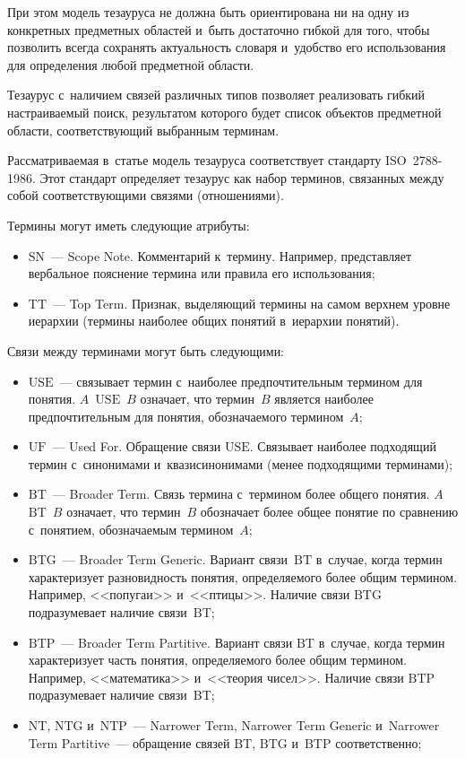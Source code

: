 \begin{multicols}{2}
     При этом модель тезауруса не должна быть ориентирована ни на одну 
из конкретных предметных областей и~быть достаточно гибкой для того, 
чтобы позволить всегда сохранять актуальность словаря и~удобство его 
использования для определения любой предметной об\-ласти.
     
     Тезаурус с~наличием связей различных типов позволяет реализовать 
гибкий настраиваемый поиск, результатом которого будет список объектов 
предметной об\-ласти, со\-от\-вет\-ст\-ву\-ющий выбранным терминам. 
     
     Рассматриваемая в~статье модель тезауруса соответствует стандарту 
ISO~2788-1986. Этот стандарт определяет тезаурус как набор терминов, 
связанных между собой со\-от\-вет\-ст\-ву\-ющи\-ми связями (отношениями). 

Термины могут иметь следующие атрибуты:
     \begin{itemize}
\item $\mathrm{SN}$~--- Scope Note. Комментарий к~термину. Например, представляет 
вербальное пояснение термина или правила его использования;
\item $\mathrm{TT}$~--- Top Term. Признак, выделяющий термины на самом верхнем 
уровне иерархии (термины наиболее общих понятий в~иерархии понятий).
\end{itemize}

     Связи между терминами могут быть сле\-ду\-ющими:
     \begin{itemize}
\item $\mathrm{USE}$~--- связывает термин с~наиболее предпочтительным термином 
для понятия. $A$~$\mathrm{USE}$~$B$ означает, что термин~$B$ является наиболее 
предпочтительным для понятия, обозначаемого термином~$A$;
\item $\mathrm{UF}$~--- Used For. Обращение связи $\mathrm{USE}$. Связывает наиболее 
подходящий термин с~синонимами и~квазисинонимами (менее 
подходящими терминами);
\item $\mathrm{BT}$~--- Broader Term. Связь термина с~термином более общего 
понятия. $A$~$\mathrm{BT}$~$B$ означает, что термин~$B$ обозначает более общее 
понятие по сравнению с~понятием, обозначаемым термином~$A$;
\item $\mathrm{BTG}$~--- Broader Term Generic. Вариант связи~$\mathrm{BT}$ в~случае, 
когда 
термин характеризует разно\-вид\-ность понятия, определяемого более 
общим термином. Например, <<попугаи>> и~<<птицы>>. Наличие связи 
$\mathrm{BTG}$ подразумевает наличие связи~$\mathrm{BT}$; 
\item $\mathrm{BTP}$~--- Broader Term Partitive. Вариант связи $\mathrm{BT}$ в~случае, когда 
термин характеризует часть понятия, определяемого более общим 
термином. Например, <<математика>> и~<<тео\-рия чисел>>. Наличие 
связи $\mathrm{BTP}$ подразумевает наличие связи~BT; 
\item $\mathrm{NT}$, $\mathrm{NTG}$ и~$\mathrm{NTP}$~--- Narrower Term, 
Narrower Term Generic и~Narrower 
Term Partitive~--- обращение связей $\mathrm{BT}$, $\mathrm{BTG}$ и~$\mathrm{BTP}$ 
со\-от\-вет\-ст\-венно; 
{

}
\end{itemize}
\end{multicols}
